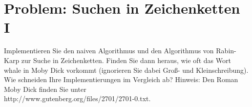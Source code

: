 \section{Problem: Suchen in Zeichenketten I}

Implementieren Sie den naiven Algorithmus und den Algorithmus von Rabin-Karp
zur Suche in Zeichenketten. Finden Sie dann heraus, wie oft das Wort whale in Moby
Dick vorkommt (ignorieren Sie dabei Groß- und Kleinschreibung). Wie schneiden
Ihre Implementierungen im Vergleich ab?
Hinweis: Den Roman Moby Dick finden Sie unter\\
http://www.gutenberg.org/files/2701/2701-0.txt.